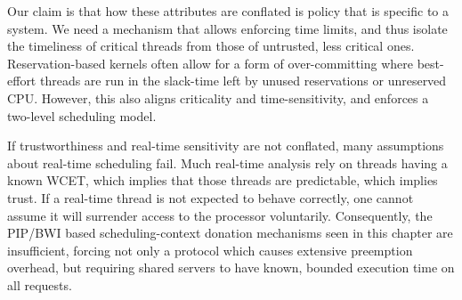 Our claim is that how these attributes are conflated is
policy that is specific to a system.
We need a mechanism that allows  enforcing time limits, and thus
isolate the timeliness of critical threads from those of untrusted,
less critical ones.
Reservation-based kernels often allow for a form of over-committing where
best-effort threads are run in the slack-time left by unused reservations or unreserved CPU.
However, this also aligns criticality and time-sensitivity, and
enforces a two-level scheduling model.

If trustworthiness and real-time sensitivity are not conflated, many assumptions about real-time
scheduling fail.
Much real-time analysis rely on threads having a known \gls{WCET}, which implies that those threads
are predictable, which implies trust.
If a real-time thread is not expected to behave correctly, one cannot
assume it will surrender access to the processor voluntarily.
Consequently, the \gls{PIP}/\gls{BWI} based scheduling-context donation mechanisms seen in this chapter are
insufficient, forcing not only a protocol which causes extensive preemption overhead, but 
requiring shared servers to have known, bounded execution time on all requests.
